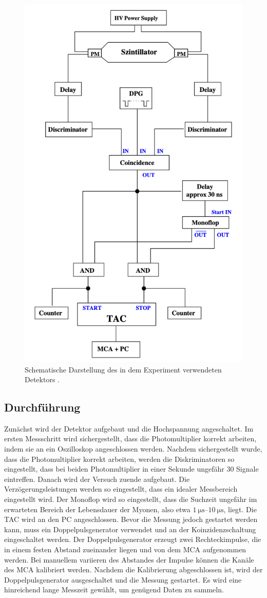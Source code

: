 \begin{figure}[H]
    \centering
    \includegraphics[width=.7\textwidth]{content/detektor.png}
    \caption{Schematische Darstellung des in dem Experiment verwendeten Detektors \cite{Anleitung01}.}
    \label{fig:detektor}
\end{figure}

\subsection{Durchführung}\label{subsec:Durchfuehrung}

Zunächst wird der Detektor aufgebaut und die Hochspannung angeschaltet.
Im ersten Messschritt wird sichergestellt, dass die Photomultiplier korrekt arbeiten, indem sie an ein Oszilloskop angeschlossen werden.
Nachdem sichergestellt wurde, dass die Photomultiplier korrekt arbeiten, werden die Diskriminatoren so eingestellt, dass bei beiden Photomultiplier in einer Sekunde ungefähr 30 Signale eintreffen.
Danach wird der Versuch zuende aufgebaut.
Die Verzögerungsleistungen werden so eingestellt, dass ein idealer Messbereich eingestellt wird.
Der Monoflop wird so eingestellt, dass die Suchzeit ungefähr im erwarteten Bereich der Lebensdauer der Myonen, also etwa $\SIrange{1}{10}{\micro\second}$, liegt.
Die TAC wird an den PC angeschlossen.\newline
Bevor die Messung jedoch gestartet werden kann, muss ein Doppelpulsgenerator verwendet und an der Koinzidenzschaltung eingeschaltet werden.
Der Doppelpulsgenerator erzeugt zwei Rechteckimpulse, die in einem festen Abstand zueinander liegen und von dem MCA aufgenommen werden.
Bei manuellem variieren des Abstandes der Impulse können die Kanäle des MCA kalibriert werden.
Nachdem die Kalibrierung abgeschlossen ist, wird der Doppelpulsgenerator ausgeschaltet und die Messung gestartet.
Es wird eine hinreichend lange Messzeit gewählt, um genügend Daten zu sammeln.